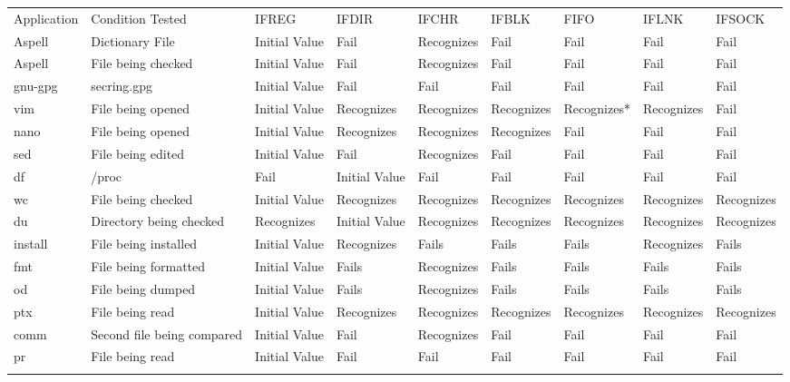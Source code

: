     \begin{table*}[t]
        \scriptsize{}
        \begin{tabular}{l  l  l  l  l  l  l  l  l}
        \toprule{}
          Application & Condition Tested           & IFREG        & IFDIR        & IFCHR     & IFBLK    & FIFO      & IFLNK    & IFSOCK\\
          Aspell      & Dictionary File            & Initial Value  & Fail           & Recognizes  & Fail       & Fail        & Fail       & Fail\\
          Aspell      & File being checked         & Initial Value  & Fail           & Recognizes  & Fail       & Fail        & Fail       & Fail\\
          gnu-gpg     & secring.gpg                & Initial Value  & Fail           & Fail        & Fail       & Fail        & Fail       & Fail\\
          vim         & File being opened          & Initial Value  & Recognizes     & Recognizes  & Recognizes & Recognizes* & Recognizes & Fail\\
          nano        & File being opened          & Initial Value  & Recognizes     & Recognizes  & Recognizes & Fail        & Fail       & Fail\\
          sed         & File being edited          & Initial Value  & Fail           & Recognizes  & Fail       & Fail        & Fail       & Fail\\
          df          & /proc                      & Fail           & Initial Value  & Fail        & Fail       & Fail        & Fail       & Fail\\
          wc          & File being checked         & Initial Value  & Recognizes     & Recognizes  & Recognizes & Recognizes  & Recognizes & Recognizes\\
          du          & Directory being checked    & Recognizes     & Initial Value  & Recognizes  & Recognizes & Recognizes  & Recognizes & Recognizes\\
          install     & File being installed       & Initial Value  & Recognizes     & Fails       & Fails      & Fails       & Recognizes & Fails\\
          fmt         & File being formatted       & Initial Value  & Fails          & Recognizes  & Fails      & Fails       & Fails      & Fails\\
          od          & File being dumped          & Initial Value  & Fails          & Recognizes  & Fails      & Fails       & Fails      & Fails\\
          ptx         & File being read            & Initial Value  & Recognizes     & Recognizes  & Recognizes & Recognizes  & Recognizes & Recognizes\\
          comm        & Second file being compared & Initial Value  & Fail           & Recognizes  & Fail       & Fail        & Fail       & Fail\\
          pr          & File being read            & Initial Value  & Fail           & Fail        & Fail       & Fail        & Fail       & Fail\\
        \bottomrule{}
        \end{tabular}
    \end{table*}

